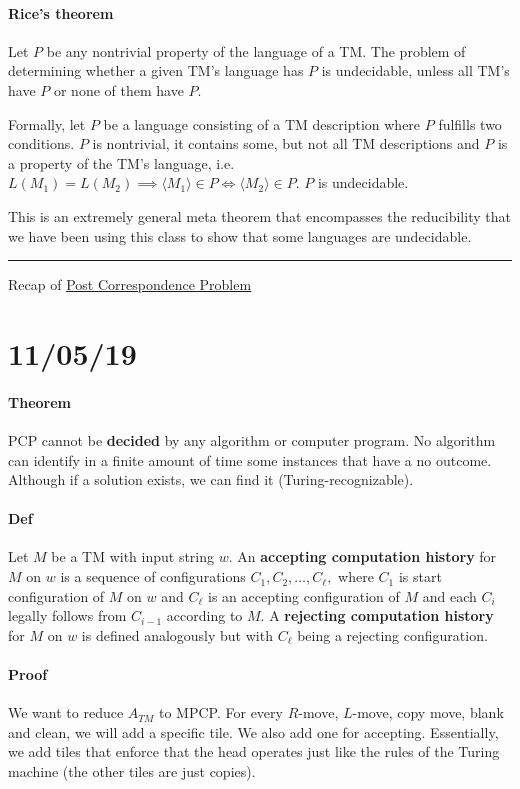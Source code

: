 \documentclass[12 pt]{article}
\begin{document}
\paragraph{Rice's theorem} Let $P$ be any nontrivial property of the
language of a TM. The problem of determining whether a given TM's
language has $P$ is undecidable, unless all TM's have $P$ or none of
them have $P$.

Formally, let $P$ be a language consisting of a TM description where
$P$ fulfills two conditions. $P$ is nontrivial, it contains some, but
not all TM descriptions and $P$ is a property of the TM's language,
i.e.\ $L(M_1) = L(M_2) \implies \langle M_1 \rangle \in P \iff \langle
M_2 \rangle \in P$. $P$ is undecidable.

This is an extremely general meta theorem that encompasses the
reducibility that we have been using this class to show that some
languages are undecidable.
\\ \noindent \rule{\textwidth}{0.5pt}
Recap of \hyperref[pcp]{Post Correspondence Problem}
\section{11/05/19}
\paragraph{Theorem} PCP cannot be \textbf{decided} by any algorithm or
computer program. No algorithm can identify in a finite amount of time
some instances that have a no outcome. Although if a solution exists,
we can find it (Turing-recognizable).

\paragraph{Def} Let $M$ be a TM with input string $w$. An
\textbf{accepting computation history} for $M$ on $w$ is a sequence of
configurations $C_1, C_2, \ldots, C_\ell,$ where $C_1$ is start
configuration of $M$ on $w$ and $C_\ell$ is an accepting configuration
of $M$ and each $C_i$ legally follows from $C_{i-1}$ according to
$M$. A \textbf{rejecting computation history} for $M$ on $w$ is
defined analogously but with $C_\ell$ being a rejecting configuration.

\paragraph{Proof} We want to reduce $A_{TM}$ to MPCP. For every
$R$-move, $L$-move, copy move, blank and clean, we will add a specific
tile. We also add one for accepting. Essentially, we add tiles that
enforce that the head operates just like the rules of the Turing
machine (the other tiles are just copies).
\end{document}
